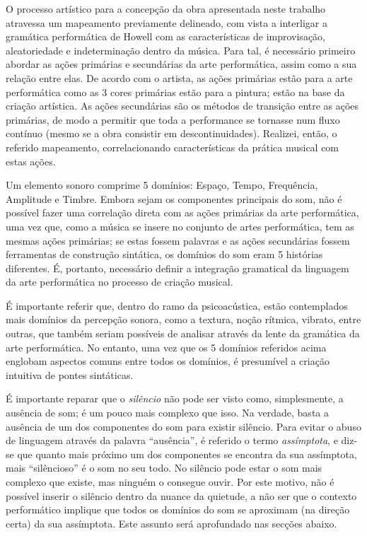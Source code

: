 \documentclass[../main.tex]{subfiles}
\begin{document}
O processo artístico para a concepção da obra apresentada neste trabalho atravessa um mapeamento previamente delineado, com vista a interligar a gramática performática de Howell\cite{howell1999} com as características de improvisação, aleatoriedade e indeterminação dentro da música\cite{cage1961,derek}. Para tal, é necessário primeiro abordar as ações primárias e secundárias da arte performática, assim como a sua relação entre elas. De acordo com o artista, as ações primárias estão para a arte performática como as 3 cores primárias estão para a pintura; estão na base da criação artística. As ações secundárias são os métodos de transição entre as ações primárias, de modo a permitir que toda a performance se tornasse num fluxo contínuo (mesmo se a obra consistir em descontinuidades). Realizei, então, o referido mapeamento, correlacionando características da prática musical com estas ações.


Um elemento sonoro comprime 5 domínios: Espaço, Tempo, Frequência, Amplitude e Timbre\cite{annette}. Embora sejam os componentes principais do som, não é possível fazer uma correlação direta com as ações primárias da arte performática, uma vez que, como a música se insere no conjunto de artes performática, tem as mesmas ações primárias; se estas fossem palavras e as ações secundárias fossem ferramentas de construção sintática, os domínios do som eram 5 histórias diferentes. É, portanto, necessário definir a integração gramatical da linguagem da arte performática no processo de criação musical.

É importante referir que, dentro do ramo da psicoacústica, estão contemplados mais domínios da percepção sonora, como a textura, noção rítmica, vibrato, entre outras\cite{olson}, que também seriam possíveis de analisar através da lente da gramática da arte performática. No entanto, uma vez que os 5 domínios referidos acima englobam aspectos comuns entre todos os domínios, é presumível a criação intuitiva de pontes sintáticas.


É importante reparar que o \textsl{silêncio} não pode ser visto como, simplesmente, a ausência de som; é um pouco mais complexo que isso. Na verdade, basta a ausência de um dos componentes do som para existir silêncio. Para evitar o abuso de linguagem através da palavra \enquote{ausência}, é referido o termo \textsl{assímptota}, e diz-se que quanto mais próximo um dos componentes se encontra da sua assímptota, mais \enquote{silêncioso} é o som no seu todo. No silêncio pode estar o som mais complexo que existe, mas ninguém o consegue ouvir. Por este motivo, não é possível inserir o silêncio dentro da nuance da quietude, a não ser que o contexto performático implique que todos os domínios do som se aproximam (na direção certa) da sua assímptota. Este assunto será aprofundado nas secções abaixo.
\end{document}
